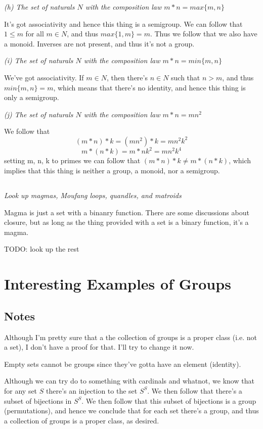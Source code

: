 \documentclass[11pt,oneside,titlepage]{book}
\newcommand{\set}[1]{\{ #1 \}}
\begin{document}
\textit{(h) The set of naturals $N$ with the composition law $m * n = max\set{m, n}$}

It's got associativity and hence this thing is a semigroup. We can follow that
$1 \leq m$ for all $m \in N$, and thus $max\set{1, m} = m$. Thus we follow that we also
have a monoid. Inverses are not present, and thus it's not a group.

\textit{(i) The set of naturals $N$ with the composition law $m * n = min\set{m, n}$}

We've got associativity. If $m \in N$, then there's $n \in N$ such that $n > m$, and thus
$min\set{m, n} = m$, which means that there's no identity, and hence this thing is only a semigroup.

\textit{(j) The set of naturals $N$ with the composition law $m * n = mn^2$}

We follow that
$$(m * n) * k = (mn^2) * k = mn^2k^2$$
$$m * (n * k) = m * nk^2 = mn^2k^4$$
setting m, n, k to primes we can follow that $(m * n) * k \neq m * (n * k)$, which implies that
this thing is neither a group, a monoid, nor a semigroup.

\subsection{}

\textit{Look up magmas, Moufang loops, quandles, and matroids}

Magma is just a set with a binanry function. There are some
discussions about closure, but as long as the thing provided with a
set is a binary function, it's a magma.

TODO: look up the rest

\section{Interesting Examples of Groups}

\subsection*{Notes}

Although I'm pretty sure that a the collection of groups is a proper class
(i.e. not a set), I don't have a proof for that. I'll try to change it now.

Empty sets cannot be groups since they've gotta have an element (identity).

Although we can try do to something with cardinals and whatnot, we know that for
any set $S$ there's an injection to the set $S^S$. We then follow that there's
a subset of bijections in $S^S$. We then follow that this subset of bijections
is a group (permutations), and hence we conclude that for each set there's a
group, and thus a collection of groups is a proper class, as desired.
\end{document}
